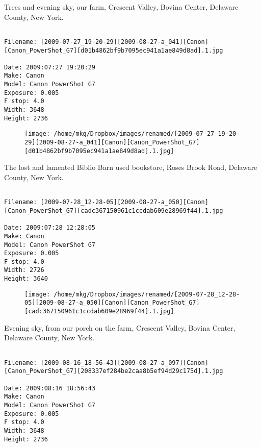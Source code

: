 \clearpage
\onecolumn
\noindent Trees and evening sky, our farm, Crescent Valley, Bovina Center, Delaware County, New York.
\noindent
\begin{lstlisting}

Filename: [2009-07-27_19-20-29][2009-08-27-a_041][Canon][Canon_PowerShot_G7][d01b4862bf9b7095ec941a1ae849d8ad].1.jpg

Date: 2009:07:27 19:20:29
Make: Canon
Model: Canon PowerShot G7
Exposure: 0.005
F stop: 4.0
Width: 3648
Height: 2736
\end{lstlisting}
\clearpage

\begin{figure}
\texttt{[image: /home/mkg/Dropbox/images/renamed/[2009-07-27\_19-20-29][2009-08-27-a\_041][Canon][Canon\_PowerShot\_G7][d01b4862bf9b7095ec941a1ae849d8ad].1.jpg]}
\end{figure}
    
\clearpage
\onecolumn
\noindent The lost and lamented Biblio Barn used bookstore, Roses Brook Road, Delaware County, New York.
\noindent
\begin{lstlisting}

Filename: [2009-07-28_12-28-05][2009-08-27-a_050][Canon][Canon_PowerShot_G7][cadc367150961c1ccdab609e28969f44].1.jpg

Date: 2009:07:28 12:28:05
Make: Canon
Model: Canon PowerShot G7
Exposure: 0.005
F stop: 4.0
Width: 2726
Height: 3640
\end{lstlisting}
\clearpage

\begin{figure}
\texttt{[image: /home/mkg/Dropbox/images/renamed/[2009-07-28\_12-28-05][2009-08-27-a\_050][Canon][Canon\_PowerShot\_G7][cadc367150961c1ccdab609e28969f44].1.jpg]}
\end{figure}
    
\clearpage
\onecolumn
\noindent Evening sky, from our porch on the farm, Crescent Valley, Bovina Center, Delaware County, New York.
\noindent
\begin{lstlisting}

Filename: [2009-08-16_18-56-43][2009-08-27-a_097][Canon][Canon_PowerShot_G7][208337ef284be2caa8b5ef94d29c175d].1.jpg

Date: 2009:08:16 18:56:43
Make: Canon
Model: Canon PowerShot G7
Exposure: 0.005
F stop: 4.0
Width: 3648
Height: 2736
\end{lstlisting}
\clearpage


